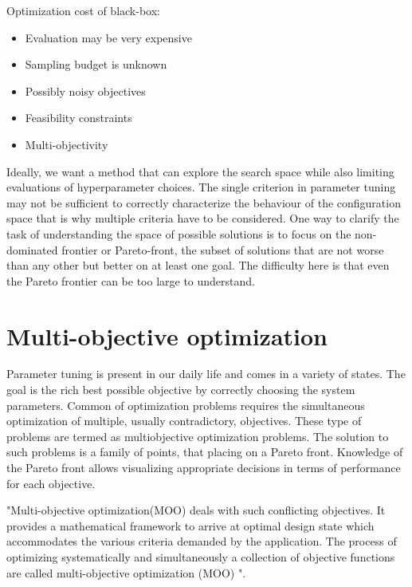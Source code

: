         Optimization cost of black-box:
        \begin{itemize}
            \item Evaluation may be very expensive
            \item Sampling budget is unknown
            \item Possibly noisy objectives
            \item Feasibility constraints
            \item Multi-objectivity
        \end{itemize}

        Ideally, we want a method that can explore the search space while also limiting evaluations of hyperparameter choices. 
        The single criterion in parameter tuning may not be sufficient to correctly characterize the behaviour of the configuration space that is why multiple criteria have to be considered.
        One way to clarify the task of understanding the space of possible solutions is to focus on the non-dominated frontier or Pareto-front, the subset of solutions that are not worse than any other but better on at least one goal. The difficulty here is that even the Pareto frontier can be too large to understand. 
    

    \section{Multi-objective optimization}

        Parameter tuning is present in our daily life and comes in a variety of states. The goal is the rich best possible objective by correctly choosing the system parameters. 
        Common of optimization problems requires the simultaneous optimization of multiple, usually contradictory, objectives. These type of problems are termed as multiobjective optimization problems. The solution to such problems is a family of points, that placing on a Pareto front. Knowledge of the Pareto front allows visualizing appropriate decisions in terms of performance for each objective.

        "Multi-objective optimization(MOO) deals with such conflicting objectives. It provides a
        mathematical framework to arrive at optimal design state which accommodates the various criteria demanded by
        the application. The process of optimizing systematically and simultaneously a collection of objective functions
        are called multi-objective optimization (MOO) \cite{odugod2013}".

